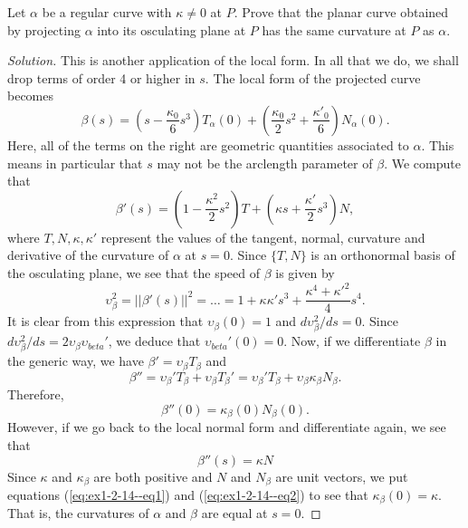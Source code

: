 \documentclass[Shifrin_Solutions_Spring_2015]{subfiles}
\begin{document}
\vspace{.5cm}


\begin{exercise}
Let $\alpha$ be a regular curve with $\kappa \neq 0$ at $P$. Prove that the planar curve obtained by projecting $\alpha$ into its osculating plane at $P$ has the same curvature at $P$ as $\alpha$.
\end{exercise}

\begin{proof}[Solution]
This is another application of the local form. In all that we do, we shall drop terms of order 4 or higher in $s$. The local form of the projected curve becomes
\[
\beta(s) = \left(s - \dfrac{\kappa_0}{6} s^3 \right) T_{\alpha}(0) + \left( \dfrac{\kappa_0}{2}s^2 + \dfrac{\kappa'_0}{6} \right) N_{\alpha}(0) .
\]
Here, all of the terms on the right are geometric quantities associated to $\alpha$. This means in particular that $s$ may not be the arclength parameter of $\beta$.
We compute that
\[
\beta'(s) = \left( 1 - \dfrac{\kappa^2}{2}s^2\right) T + \left( \kappa s + \dfrac{\kappa'}{2}s^3\right) N,
\]
where $T, N, \kappa, \kappa'$ represent the values of the tangent, normal, curvature and derivative of the curvature of $\alpha$ at $s=0$. Since $\{T, N\}$ is an orthonormal basis of the osculating plane, we see that the speed of $\beta$ is given by
\[
\upsilon_{\beta}^2 = ||\beta'(s)||^2 = \dots = 1 + \kappa\kappa' s^3 + \dfrac{\kappa^4 + {\kappa'}^2}{4}s^4 .
\]
It is clear from this expression that $\upsilon_{\beta}(0) = 1$ and $d\upsilon_{\beta}^2/ds = 0$. Since $d\upsilon_{\beta}^2/ds = 2\upsilon_{\beta} \upsilon_{beta}'$, we deduce that $\upsilon_{beta}'(0) = 0.$
Now, if we differentiate $\beta$ in the generic way, we have $\beta' = \upsilon_{\beta} T_{\beta}$ and
\[
\beta'' = \upsilon_{\beta}' T_{\beta} + \upsilon_{\beta}T_{\beta}' = \upsilon_{\beta}' T_{\beta} + \upsilon_{\beta}\kappa_{\beta}N_{\beta} .
\]
Therefore,
\begin{equation}\label{eq:ex1-2-14--eq1}
\beta''(0) =  \kappa_{\beta}(0) N_{\beta}(0).
\end{equation}
However, if we go back to the local normal form and differentiate again, we see that
\begin{equation}\label{eq:ex1-2-14--eq2}
\beta''(s) = \kappa N
\end{equation}
Since $\kappa$ and $\kappa_{\beta}$ are both positive and $N$ and $N_{\beta}$ are unit vectors, we put equations (\ref{eq:ex1-2-14--eq1}) and (\ref{eq:ex1-2-14--eq2}) to see that $\kappa_{\beta}(0) = \kappa$. That is, the curvatures of $\alpha$ and $\beta$ are equal at $s=0$.
\end{proof}
\end{document}
